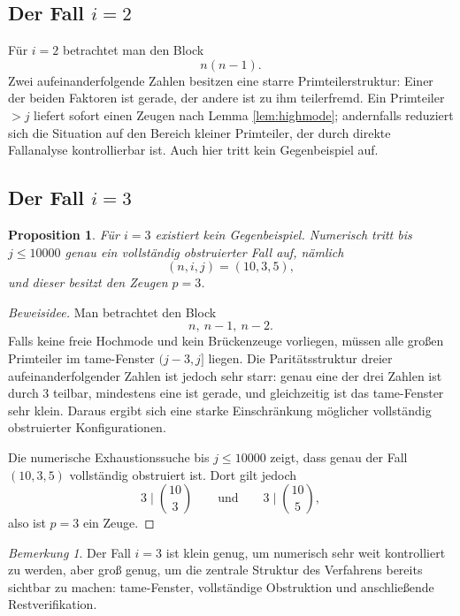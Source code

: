 \documentclass[12pt,a4paper]{article}
\theoremstyle{plain}
\newtheorem{proposition}{Proposition}
\theoremstyle{definition}
\theoremstyle{remark}
\newtheorem{bemerkung}{Bemerkung}
\begin{document}
	\subsection*{Der Fall $i=2$}
	
	Für $i=2$ betrachtet man den Block
	\[
	n(n-1).
	\]
	Zwei aufeinanderfolgende Zahlen besitzen eine starre Primteilerstruktur: Einer der beiden Faktoren ist gerade, der andere ist zu ihm teilerfremd. 
	Ein Primteiler $>j$ liefert sofort einen Zeugen nach Lemma \ref{lem:highmode}; andernfalls reduziert sich die Situation auf den Bereich kleiner Primteiler, der durch direkte Fallanalyse kontrollierbar ist. 
	Auch hier tritt kein Gegenbeispiel auf.
	
	\subsection*{Der Fall $i=3$}
	
	\begin{proposition}\label{prop:i3}
		Für $i=3$ existiert kein Gegenbeispiel. 
		Numerisch tritt bis $j\le 10000$ genau ein vollständig obstruierter Fall auf, nämlich
		\[
		(n,i,j)=(10,3,5),
		\]
		und dieser besitzt den Zeugen $p=3$.
	\end{proposition}
	
	\begin{proof}[Beweisidee]
		Man betrachtet den Block
		\[
		n,\ n-1,\ n-2.
		\]
		Falls keine freie Hochmode und kein Brückenzeuge vorliegen, müssen alle großen Primteiler im tame-Fenster $(j-3,j]$ liegen. 
		Die Paritätsstruktur dreier aufeinanderfolgender Zahlen ist jedoch sehr starr: genau eine der drei Zahlen ist durch $3$ teilbar, mindestens eine ist gerade, und gleichzeitig ist das tame-Fenster sehr klein. 
		Daraus ergibt sich eine starke Einschränkung möglicher vollständig obstruierter Konfigurationen.
		
		Die numerische Exhaustionssuche bis $j\le 10000$ zeigt, dass genau der Fall $(10,3,5)$ vollständig obstruiert ist. 
		Dort gilt jedoch
		\[
		3 \mid \binom{10}{3}
		\qquad\text{und}\qquad
		3 \mid \binom{10}{5},
		\]
		also ist $p=3$ ein Zeuge.
	\end{proof}
	
	\begin{bemerkung}
		Der Fall $i=3$ ist klein genug, um numerisch sehr weit kontrolliert zu werden, aber groß genug, um die zentrale Struktur des Verfahrens bereits sichtbar zu machen: tame-Fenster, vollständige Obstruktion und anschließende Restverifikation.
	\end{bemerkung}
	
\end{document}
